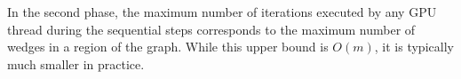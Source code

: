         








In the second phase, the maximum number of iterations executed by any GPU thread during the sequential steps corresponds to the maximum number of wedges in a region of the graph. While this upper bound is \(O(m)\), it is typically much smaller in practice.


